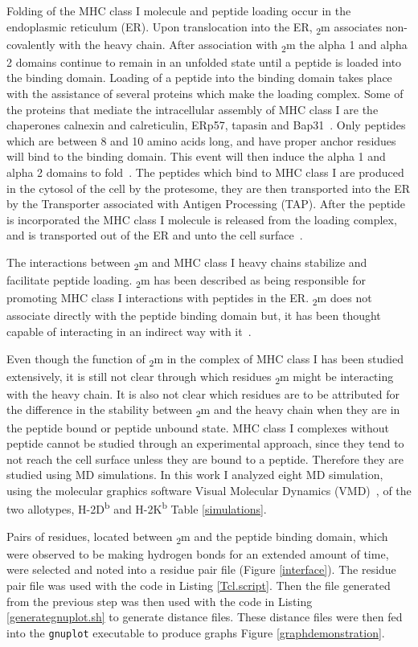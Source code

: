 \documentclass[11pt,twocolumn]{article}
\newcommand{\db}{H-2D\textsuperscript{b}\xspace}
\newcommand{\kb}{H-2K\textsuperscript{b}\xspace}
\newcommand{\btm}{\textbeta\textsubscript{2}m\xspace}
\begin{document}
Folding of the MHC class I molecule and peptide loading occur in the
endoplasmic reticulum (ER). Upon translocation into the ER, \btm associates
non-covalently with the heavy chain. After association with \btm the alpha 1
and alpha 2 domains continue to remain in an unfolded state until a peptide is
loaded into the binding domain.  Loading of a peptide into the binding domain
takes place with the assistance of several proteins which make the loading
complex. Some of the proteins that mediate the intracellular assembly of MHC
class I are the chaperones calnexin and calreticulin, ERp57, tapasin and
Bap31~\cite{zhang2006assembly}. Only peptides which are between 8 and 10 amino
acids long, and have proper anchor residues will bind to the binding domain.
This event will then induce  the alpha 1 and alpha 2 domains to
fold~\cite{simone2012analysis}. The peptides which bind to MHC class I are
produced in the cytosol of the cell by the protesome, they are then transported
into the ER by the Transporter associated with Antigen Processing (TAP). After
the peptide is incorporated the MHC class I molecule is released from the
loading complex, and is transported out of the ER and unto the cell
surface~\cite{lundegaard2012predictions}.


The interactions between \btm and MHC class I heavy chains stabilize and
facilitate peptide loading. \btm has been described as being responsible for
promoting MHC class I interactions with  peptides in the ER.  \btm does not
associate directly with the peptide binding domain but, it has been thought
capable of interacting in an indirect way with  it~\cite{smith1993alteration}.

Even though the function of \btm in the complex of MHC class I has been studied
extensively, it is still not clear through which residues  \btm might be
interacting with the heavy chain. It is also not clear which residues are to be
attributed for the difference in the stability between \btm and the heavy chain
when they are in the peptide bound or peptide unbound state. MHC class I
complexes without peptide cannot be studied through an experimental approach,
since they tend to not reach the cell surface unless they are bound to a
peptide. Therefore they are studied using MD simulations. In this work I
analyzed eight MD simulation, using the molecular graphics software Visual
Molecular Dynamics (VMD)~\cite{vmd96}, of the two allotypes, \db and \kb Table
\ref{simulations}. 

Pairs of residues, located between \btm and the peptide binding domain, which
were observed to be making hydrogen bonds for an extended amount of time, were
selected and noted into a residue pair file (Figure \ref{interface}). The
residue pair file was used with the code in Listing \ref{Tcl.script}.  Then the
file generated from the previous step was then used with the code in Listing
\ref{generategnuplot.sh} to generate distance files. These distance files were
then fed into the \texttt{gnuplot} executable to produce graphs Figure
\ref{graphdemonstration}. 
\end{document}
